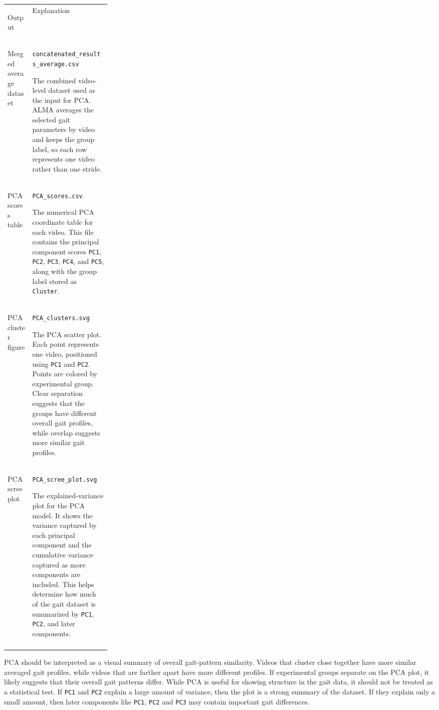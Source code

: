 \documentclass[11pt]{article}
\newif\ifalmaoutputtable
\newcommand{\boxedtoprule}{%
  \ifalmaoutputtable
    \arrayrulecolor{calloutOutputFrame}\hline\rowcolor{calloutOutputHeader}%
  \else
    \arrayrulecolor{almaBlue!62}\hline\rowcolor{almaSky!78}%
  \fi
}
\newcommand{\boxedmidrule}{%
  \ifalmaoutputtable
    \arrayrulecolor{calloutOutputFrame}\hline
  \else
    \arrayrulecolor{calloutDataFrame}\hline
  \fi
}
\newcommand{\boxedbottomrule}{%
  \ifalmaoutputtable
    \arrayrulecolor{calloutOutputFrame}\hline
  \else
    \arrayrulecolor{almaBlue!62}\hline
  \fi
}
\renewcommand{\[}{%
  \par\smallskip\noindent
  \begin{center}%
  \setlength{\fboxsep}{5pt}%
  \setlength{\fboxrule}{0.35pt}%
  \begin{lrbox}{\almaEquationBox}%
  $\displaystyle
}
\renewcommand{\]}{%
  $%
  \end{lrbox}%
  \fcolorbox{equationLine}{equationBack}{\usebox{\almaEquationBox}}%
  \end{center}%
  \smallskip\par
}
\begin{document}
\begin{tcolorbox}[output file box,title=\textbf{ALMA PCA Output Files}]
\begin{tabularx}{\linewidth}{
>{\bfseries\raggedright\arraybackslash}p{0.24\linewidth}|
>{\raggedright\arraybackslash}X
}
\boxedtoprule
Output & Explanation \\
\boxedmidrule
Merged average dataset & \texttt{concatenated\_results\_average.csv}\par
The combined video-level dataset used as the input for PCA. ALMA averages the selected gait parameters by video and keeps the group label, so each row represents one video rather than one stride. \\
PCA scores table & \texttt{PCA\_scores.csv}\par
The numerical PCA coordinate table for each video. This file contains the principal component scores \texttt{PC1}, \texttt{PC2}, \texttt{PC3}, \texttt{PC4}, and \texttt{PC5}, along with the group label stored as \texttt{Cluster}. \\
PCA cluster figure & \texttt{PCA\_clusters.svg}\par
The PCA scatter plot. Each point represents one video, positioned using \texttt{PC1} and \texttt{PC2}. Points are colored by experimental group. Clear separation suggests that the groups have different overall gait profiles, while overlap suggests more similar gait profiles. \\
PCA scree plot & \texttt{PCA\_scree\_plot.svg}\par
The explained-variance plot for the PCA model. It shows the variance captured by each principal component and the cumulative variance captured as more components are included. This helps determine how much of the gait dataset is summarized by \texttt{PC1}, \texttt{PC2}, and later components. \\
\boxedbottomrule
\end{tabularx}
\end{tcolorbox}

PCA should be interpreted as a visual summary of overall gait-pattern similarity. Videos that cluster close together have more similar averaged gait profiles, while videos that are farther apart have more different profiles. If experimental groups separate on the PCA plot, it likely suggests that their overall gait patterns differ. While PCA is useful for showing structure in the gait data, it should not be treated as a statistical test. If \texttt{PC1} and \texttt{PC2} explain a large amount of variance, then the plot is a strong summary of the dataset. If they explain only a small amount, then later components like \texttt{PC1}, \texttt{PC2} and \texttt{PC3} may contain important gait differences.
\end{document}
